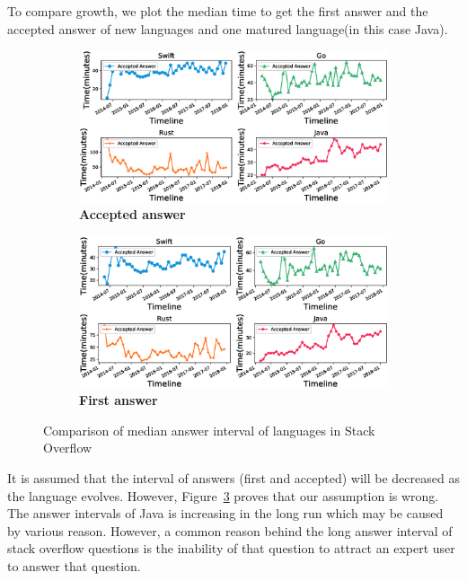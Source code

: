 To compare growth, we plot the median time to get the first answer and the accepted answer of new languages and one matured language(in this case Java).
\begin{figure}[htbp]
\begin{subfigure}{0.6\textwidth}
\centering
\hspace{-3cm}
\includegraphics[scale=0.38]{figures/AcceptedAnswerInterval.eps}
\caption{\textbf{Accepted answer}}
\label{fig:Accepted Answer interval}
\end{subfigure}
\begin{subfigure}{0.6\textwidth}
\centering
\hspace{-3cm}
\includegraphics[scale=0.38]{figures/FirstAnswerInterval.eps}
\caption{\textbf{First answer}}
\label{fig:First Answer interval}
\end{subfigure}
\caption{Comparison of median answer interval  of languages in Stack Overflow}
\label{fig:Answer intervals}
\end{figure}
It is assumed that the interval of answers (first and accepted) will be decreased as the language evolves. However, Figure~\ref{fig:Answer intervals} proves that our assumption is wrong. The answer intervals of Java is increasing in the long run which may be caused by various reason. However, a common reason behind the long answer interval of  stack overflow questions is the inability of that question to attract an expert user to answer that question\citep{Asaduzzaman2013}.
